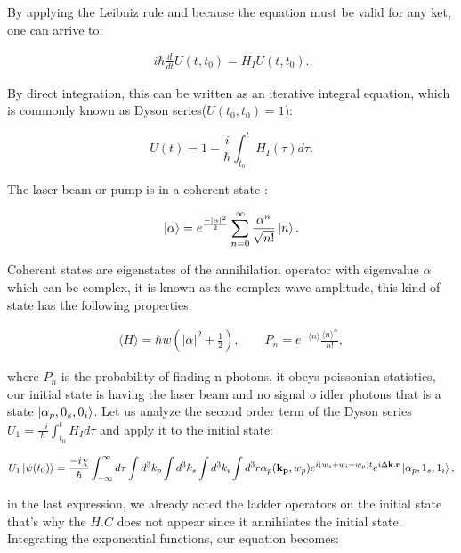 \documentclass[12pt]{article}
\begin{document}
By applying the Leibniz rule and because the equation must be valid for any ket, one can arrive to:

\begin{align}
i \hbar \frac{d}{dt}U(t,t_{0})=H_{I}U(t,t_{0}).
\end{align}

By direct integration, this can be written as an iterative integral equation, which is commonly known as Dyson series($U(t_{0},t_{0})=1$):

\begin{equation}
U(t)=1-\frac{i}{\hbar} \int_{t_{0}}^{t} H_{I} (\tau) d\tau.
\end{equation}

The laser beam or pump is in a coherent state \cite{leonhardt}:

\begin{equation}
\ket{\alpha}=e^{\frac{-|\alpha|^{2}}{2}} \sum_{n=0}^{\infty} \frac{\alpha^{n}}{\sqrt{n!}} \ket{n}.
\end{equation}

Coherent states are eigenstates of the annihilation operator with eigenvalue $\alpha$ which can be complex, it is known as the complex wave amplitude, this kind of state has the following properties:

\begin{align}
\langle H \rangle = \hbar w (|\alpha|^{2}+\frac{1}{2}),\qquad P_{n}=e^{-\langle n\rangle}\frac{\langle n \rangle^{n}}{n!},
\end{align}

where $P_{n}$ is the probability of finding n photons, it obeys poissonian statistics, our initial state is having the laser beam and no signal o idler photons that is a state $\ket{\alpha_{p},0_{s},0_{i}}$. Let us analyze the second order term of the Dyson series  $U_{1}=\frac{-i}{\hbar}\int_{t_{0}}^{t} H_{I} d\tau$ and apply it to the initial state:

\begin{align}
 U_{1}\ket{\psi(t_{0})}=\frac{-i \chi}{\hbar}  \int_{-\infty}^{\infty} d\tau \int d^{3}k_{p}\int d^{3}k_{s}\int d^{3}k_{i}\int d^{3}r \alpha_{p} (\mathbf{k_{p}},w_{p}) e^{i(w_{s}+w_{i}-w_{p})t}e^{i \Delta\textbf{k}.\textbf{r}}\ket{\alpha_{p},1_{s},1_{i}} ,
\end{align}

in the last expression, we already acted the ladder operators on the initial state that's why the $H.C$ does not appear since it annihilates the initial state. Integrating the exponential functions, our equation becomes:
\end{document}
